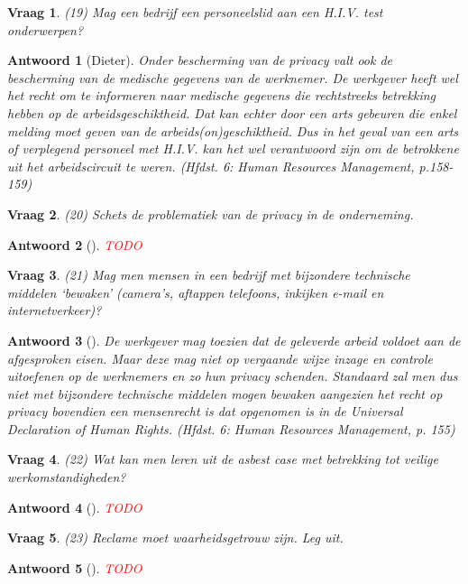 \documentclass{article}
\theoremstyle{nonumberplain}
\newtheorem{question}{Vraag}
\newtheorem{answer}{Antwoord}
\begin{document}
\begin{question}
(19)	Mag een bedrijf een personeelslid aan een H.I.V. test onderwerpen? 
\end{question}
\begin{answer}[Dieter]
	Onder bescherming van de privacy valt ook de bescherming van de medische gegevens van de werknemer.
	De werkgever heeft wel het recht om te informeren naar medische gegevens die rechtstreeks betrekking hebben op de arbeidsgeschiktheid.
	Dat kan echter door een arts gebeuren die enkel melding moet geven van de arbeids(on)geschiktheid.
	Dus in het geval van een arts of verplegend personeel met H.I.V. kan het wel verantwoord zijn om de betrokkene uit het arbeidscircuit te weren.
	\textit{(Hfdst. 6: Human Resources Management, p.158-159)}
\end{answer}

\begin{question}
(20)	Schets de problematiek van de privacy in de onderneming.
\end{question}
\begin{answer}[]
\textcolor{red}{TODO}%
\end{answer}

\begin{question}
(21)	Mag men mensen in een bedrijf met bijzondere technische middelen `bewaken' (camera's, aftappen telefoons, inkijken e-mail en internetverkeer)?
\end{question}
\begin{answer}[]
	De werkgever mag toezien dat de geleverde arbeid voldoet aan de afgesproken eisen.
	Maar deze mag niet op vergaande wijze inzage en controle uitoefenen op de werknemers en zo hun privacy schenden.
	Standaard zal men dus niet met bijzondere technische middelen mogen bewaken aangezien het recht op privacy bovendien een mensenrecht is dat opgenomen is in de \emph{Universal Declaration of Human Rights}.
	\textit{(Hfdst. 6: Human Resources Management, p. 155)}
\end{answer}

\begin{question}
(22)	Wat kan men leren uit de asbest case met betrekking tot veilige werkomstandigheden? 
\end{question}
\begin{answer}[]
\textcolor{red}{TODO}%
\end{answer}

\begin{question}
(23)	Reclame moet waarheidsgetrouw zijn. Leg uit.
\end{question}
\begin{answer}[]
\textcolor{red}{TODO}%
\end{answer}
\end{document}
